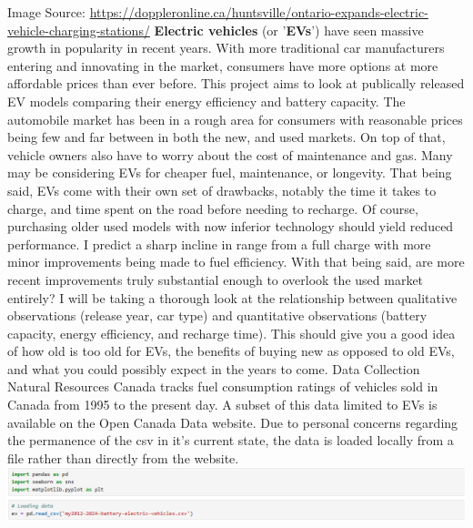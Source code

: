 \documentclass{article}
\begin{document}
{  \large Image Source: \url{https://doppleronline.ca/huntsville/ontario-expands-electric-vehicle-charging-stations/}
  \newline \newline
  \normalsize \textbf{Electric vehicles} (or '\textbf{EVs}') have seen massive growth in popularity in recent years. With more
  traditional car manufacturers entering and innovating in the market, consumers have more options at more affordable
  prices than ever before. This project aims to look at publically released EV models comparing their energy efficiency
  and battery capacity. The automobile market has been in a rough area for consumers with reasonable prices being few
  and far between in both the new, and used markets. On top of that, vehicle owners also have to worry about the cost
  of maintenance and gas. Many may be considering EVs for cheaper fuel, maintenance, or longevity. That being said, EVs
  come with their own set of drawbacks, notably the time it takes to charge, and time spent on the road before needing
  to recharge. Of course, purchasing older used models with now inferior technology should yield reduced performance. I
  predict a sharp incline in range from a full charge with more minor improvements being made to fuel efficiency. With
  that being said, are more recent improvements truly substantial enough to overlook the used market entirely? I will be
  taking a thorough look at the relationship between qualitative observations (release year, car type) and quantitative
  observations (battery capacity, energy efficiency, and recharge time). This should give you a good idea of how old is
  too old for EVs, the benefits of buying new as opposed to old EVs, and what you could possibly expect in the years to come.
  \newpage
  \Large Data Collection
  \newline \newline
  \normalsize Natural Resources Canada tracks fuel consumption ratings of vehicles sold in Canada from 1995 to the present
  day. A subset of this data limited to EVs is available on the Open Canada Data website. Due to personal concerns regarding
  the permanence of the csv in it's current state, the data is loaded locally from a file rather than directly from the website.
  \newline \newline
  \includegraphics[width=\textwidth]{code_01.png}
}
\end{document}
